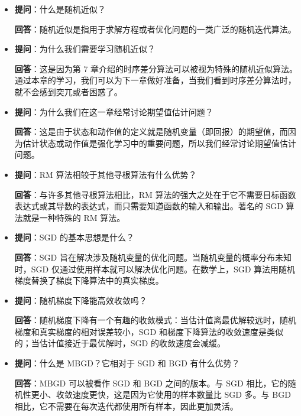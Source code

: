 \begin{itemize}
  \item \textbf{提问}：什么是随机近似？

  \textbf{回答}：随机近似是指用于求解方程或者优化问题的一类广泛的随机迭代算法。

  \item \textbf{提问}：为什么我们需要学习随机近似？

  \textbf{回答}：这是因为第 7 章介绍的时序差分算法可以被视为特殊的随机近似算法。通过本章的学习，我们可以为下一章做好准备，当我们看到时序差分算法时，就不会感到突兀或者困惑了。

  \item \textbf{提问}：为什么我们在这一章经常讨论期望值估计问题？

  \textbf{回答}：这是由于状态和动作值的定义就是随机变量（即回报）的期望值，而因为估计状态或动作值是强化学习中的重要问题，所以我们经常讨论期望值估计问题。

  \item \textbf{提问}：RM 算法相较于其他寻根算法有什么优势？

  \textbf{回答}：与许多其他寻根算法相比，RM 算法的强大之处在于它不需要目标函数表达式或其导数的表达式，而只需要知道函数的输入和输出。著名的 SGD 算法就是一种特殊的 RM 算法。

  \item \textbf{提问}：SGD 的基本思想是什么？

  \textbf{回答}：SGD 旨在解决涉及随机变量的优化问题。当随机变量的概率分布未知时，SGD 仅通过使用样本就可以解决优化问题。在数学上，SGD 算法用随机梯度替换了梯度下降算法中的真实梯度。

  \item \textbf{提问}：随机梯度下降能高效收敛吗？

  \textbf{回答}：随机梯度下降有一个有趣的收敛模式：当估计值离最优解较远时，随机梯度和真实梯度的相对误差较小，SGD 和梯度下降算法的收敛速度是类似的；当估计值接近于最优解时，SGD 的收敛速度会减缓。

  \item \textbf{提问}：什么是 MBGD？它相对于 SGD 和 BGD 有什么优势？

  \textbf{回答}：MBGD 可以被看作 SGD 和 BGD 之间的版本。与 SGD 相比，它的随机性更小、收敛速度更快，这是因为它使用的样本数量比 SGD 多。与 BGD 相比，它不需要在每次迭代都使用所有样本，因此更加灵活。
\end{itemize}
